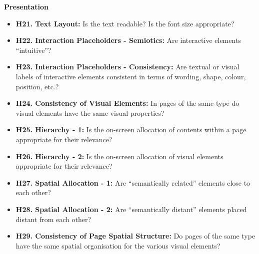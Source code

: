 \textbf{Presentation}
\begin{itemize}
    \item \textbf{H21.  Text Layout:} Is the text readable? Is the font size appropriate?
    \item \textbf{H22.  Interaction Placeholders - Semiotics:} Are interactive elements “intuitive”?
    \item \textbf{H23.  Interaction Placeholders - Consistency:} Are textual or visual labels of interactive elements consistent in terms of wording, shape, colour, position, etc.?
    \item \textbf{H24.  Consistency of Visual Elements:} In pages of the same type do visual elements have the same visual properties?
    \item \textbf{H25.  Hierarchy - 1:} Is the on-screen allocation of contents within a page appropriate for their relevance?
    \item \textbf{H26.  Hierarchy - 2:} Is the on-screen allocation of visual elements appropriate for their relevance?
    \item \textbf{H27.  Spatial Allocation - 1:} Are “semantically related” elements close to each other?
    \item \textbf{H28.  Spatial Allocation - 2:} Are “semantically distant” elements placed distant from each other?
    \item \textbf{H29.  Consistency of Page Spatial Structure:} Do pages of the same type have the same spatial organisation for the various visual elements?
\end{itemize}
